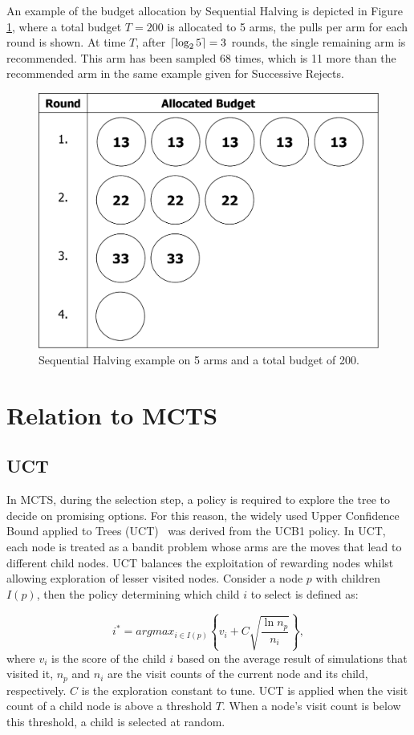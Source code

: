 \documentclass{kecsmstr}
\DeclarePairedDelimiter{\ceil}{\lceil}{\rceil}
\begin{document}
An example of the budget allocation by Sequential Halving is depicted in Figure \ref{fig:seq-halving}, where a total budget $T = 200$ is allocated to 5 arms, the pulls per arm for each round is shown. At time $T$, after $\ceil{\log_2{5}}=3$ rounds, the single remaining arm is recommended. This arm has been sampled 68 times, which is 11 more than the recommended arm in the same example given for Successive Rejects.

\begin{figure}[ht]
	\centering
	\includegraphics[width=.5\textwidth]{img/seq_halv.png}
	\caption{Sequential Halving example on 5 arms and a total budget of 200.}
	\label{fig:seq-halving}
\end{figure}

\newpage

\section{Relation to MCTS}
\label{sec:mabmcts}
\subsection{UCT}
In MCTS, during the selection step, a policy is required to explore the tree to decide on promising options. For this reason, the widely used Upper Confidence Bound applied to Trees (UCT)~ was derived from the UCB1 policy. In UCT, each node is treated as a bandit problem whose arms are the moves that lead to different child nodes. UCT balances the exploitation of rewarding nodes whilst allowing exploration of lesser visited nodes. Consider a node $p$ with children $I(p)$, then the policy determining which child $i$ to select is defined as:

\begin{equation}
\label{eq:uct}
i^* = argmax_{i \in I(p)}\left\{ v_i + C \sqrt{ \frac{\ln{n_p}}{n_i}}\right\},
\end{equation}
where $v_i$ is the score of the child $i$ based on the average result of simulations that visited it, $n_p$ and $n_i$ are the visit counts of the current node and its child, respectively. $C$ is the exploration constant to tune. UCT is applied when the visit count of a child node is above a threshold $T$. When a node's visit count is below this threshold, a child is selected at random.
\end{document}
